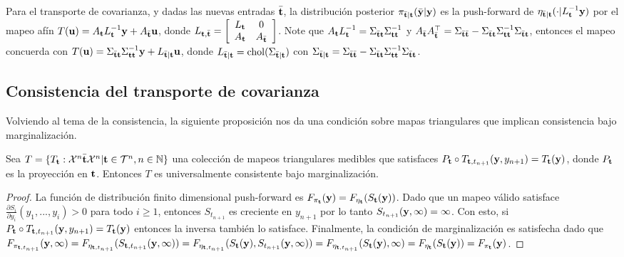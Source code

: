 Para el transporte de covarianza, y dadas las nuevas entradas \(\bar{\mathbf{t}}\), la distribución posterior \(\pi_{\bar{\mathbf{t}}|\mathbf{t}}(\bar{\mathbf{y}}|\mathbf{y})\) es la push-forward de \(\eta_{\bar{\mathbf{t}}|\mathbf{t}}(\cdot|L_{\mathbf{t}}^{-1}\mathbf{y})\) por el mapeo afín \(T(\mathbf{u}) = A_{\mathbf{t}}L_{\mathbf{t}}^{-1}\mathbf{y} + A_{\bar{\mathbf{t}}}\mathbf{u}\), donde \(L_{\mathbf{t},\bar{\mathbf{t}}}=\left[ \begin{array}{cc} L_{\mathbf{t}} & 0\\ A_{\mathbf{t}} & A_{\bar{\mathbf{t}}} \end{array}\right]\). Note que \(A_{\mathbf{t}}L_{\mathbf{t}}^{-1} = \Sigma_{\bar{\mathbf{t}}\mathbf{t}}\Sigma_{\mathbf{t}\mathbf{t}}^{-1}\) y \(A_{\bar{\mathbf{t}}}A_{\bar{\mathbf{t}}}^\top = \Sigma_{\bar{\mathbf{t}}\bar{\mathbf{t}}} - \Sigma_{\bar{\mathbf{t}}\mathbf{t}}\Sigma_{\mathbf{t}\mathbf{t}}^{-1}\Sigma_{\bar{\mathbf{t}}\mathbf{t}}\), entonces el mapeo concuerda con \(T(\mathbf{u}) = \Sigma_{\bar{\mathbf{t}}\mathbf{t}}\Sigma_{\mathbf{t}\mathbf{t}}^{-1}\mathbf{y} + L_{\bar{\mathbf{t}}|\mathbf{t}}\mathbf{u}\), donde \(L_{\bar{\mathbf{t}}|\mathbf{t}} = \operatorname{chol}(\Sigma_{\bar{\mathbf{t}}|\mathbf{t}})\) con \(\Sigma_{\bar{\mathbf{t}}|\mathbf{t}} = \Sigma_{\bar{\mathbf{t}}\bar{\mathbf{t}}} - \Sigma_{\bar{\mathbf{t}}\mathbf{t}}\Sigma_{\mathbf{t}\mathbf{t}}^{-1}\Sigma_{\bar{\mathbf{t}}\mathbf{t}}\). 

\subsection{Consistencia del transporte de covarianza}

Volviendo al tema de la consistencia, la siguiente proposición nos da una condición sobre mapas triangulares que implican consistencia bajo marginalización.
\begin{proposition}
	Sea \(T=\{T_{\mathbf{t}}:\mathcal{X}^n \bar{\mathbf{t}} \mathcal{X}^n | \mathbf{t} \in \mathcal{T}^n, n \in \mathbb{N}\}\) una colección de mapeos triangulares medibles que satisfaces \(P_{\mathbf{t}} \circ T_{\mathbf{t},t_{n+1}}(\mathbf{y},y_{n+1}) = T_{\mathbf{t}}(\mathbf{y})\), donde \(P_{\mathbf{t}}\) es la proyección en \(\mathbf{t}\). Entonces \(T\) es universalmente consistente bajo marginalización.
	\begin{proof}
		La función de distribución finito dimensional push-forward  es \(F_{\pi_{\mathbf{t}}}(\mathbf{y}) = F_{\eta_{\mathbf{t}}}(S_{\mathbf{t}}(\mathbf{y}))\). Dado que un mapeo válido satisface \(\frac{\partial S_i}{\partial  y_i}(y_1,...,y_i)>0\) para todo \(i\ge 1\), entonces \(S_{t_{n+1}}\) es creciente en \(y_{n+1}\) por lo tanto \(S_{t_{n+1}}(\mathbf{y},\infty) = \infty\). Con esto, si \(P_{\mathbf{t}} \circ T_{\mathbf{t},t_{n+1}}(\mathbf{y},y_{n+1}) = T_{\mathbf{t}}(\mathbf{y})\) entonces la inversa también lo satisface. Finalmente, la condición de marginalización es satisfecha dado que \(F_{\pi_{\mathbf{t},t_{n+1}}}(\mathbf{y},\infty) = F_{\eta_{\mathbf{t},t_{n+1}}}(S_{\mathbf{t},t_{n+1}}(\mathbf{y},\infty)) = F_{\eta_{\mathbf{t},t_{n+1}}}(S_{\mathbf{t}}(\mathbf{y}), S_{t_{n+1}}(\mathbf{y},\infty)) = F_{\eta_{\mathbf{t},t_{n+1}}}(S_{\mathbf{t}}(\mathbf{y}), \infty) = F_{\eta_{\mathbf{t}}}(S_{\mathbf{t}}(\mathbf{y})) = F_{\pi_{\mathbf{t}}}(\mathbf{y})\).
	\end{proof}
\end{proposition}

